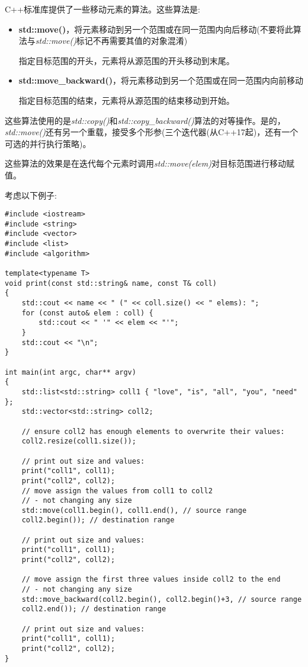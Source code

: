 C++标准库提供了一些移动元素的算法。这些算法是:\par

\begin{itemize}
	\item \textbf{std::move()}，将元素移动到另一个范围或在同一范围内向后移动(不要将此算法与\textit{std::move()}标记不再需要其值的对象混淆)\par
	指定目标范围的开头，元素将从源范围的开头移动到末尾。
	\item \textbf{std::move\_backward()}，将元素移动到另一个范围或在同一范围内向前移动\par
	指定目标范围的结束，元素将从源范围的结束移动到开始。
\end{itemize}

这些算法使用的是\textit{std::copy()}和\textit{std::copy\_backward()}算法的对等操作。是的，\textit{std::move()}还有另一个重载，接受多个形参(三个迭代器(从C++17起)，还有一个可选的并行执行策略)。\par

这些算法的效果是在迭代每个元素时调用\textit{std::move(elem)}对目标范围进行移动赋值。\par

考虑以下例子:\par

{\color{red}{lib/movealgo.cpp}}\par

\begin{lstlisting}[caption={}]
#include <iostream>
#include <string>
#include <vector>
#include <list>
#include <algorithm>

template<typename T>
void print(const std::string& name, const T& coll)
{
	std::cout << name << " (" << coll.size() << " elems): ";
	for (const auto& elem : coll) {
		std::cout << " '" << elem << "'";
	}
	std::cout << "\n";
}

int main(int argc, char** argv)
{
	std::list<std::string> coll1 { "love", "is", "all", "you", "need" };
	std::vector<std::string> coll2;
	
	// ensure coll2 has enough elements to overwrite their values:
	coll2.resize(coll1.size());
	
	// print out size and values:
	print("coll1", coll1);
	print("coll2", coll2);
	// move assign the values from coll1 to coll2
	// - not changing any size
	std::move(coll1.begin(), coll1.end(), // source range
	coll2.begin()); // destination range
	
	// print out size and values:
	print("coll1", coll1);
	print("coll2", coll2);
	
	// move assign the first three values inside coll2 to the end
	// - not changing any size
	std::move_backward(coll2.begin(), coll2.begin()+3, // source range
	coll2.end()); // destination range
	
	// print out size and values:
	print("coll1", coll1);
	print("coll2", coll2);
}
\end{lstlisting}

